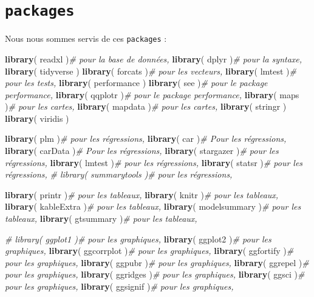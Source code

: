 \documentclass[
  11pt,
  french,
]{article}
\newenvironment{Shaded}{\begin{snugshade}}{\end{snugshade}}
\newcommand{\CommentTok}[1]{\textcolor[rgb]{0.56,0.35,0.01}{\textit{#1}}}
\newcommand{\KeywordTok}[1]{\textcolor[rgb]{0.13,0.29,0.53}{\textbf{#1}}}
\newcommand{\NormalTok}[1]{#1}
\begin{document}
\hypertarget{packages}{%
\section{\texorpdfstring{\texttt{packages}}{packages}}\label{packages}}

Nous nous sommes servis de ces \texttt{packages} :

\begin{Shaded}
\begin{Highlighting}[]
\KeywordTok{library}\NormalTok{( readxl )}\CommentTok{# pour la base de données,}
\KeywordTok{library}\NormalTok{( dplyr )}\CommentTok{# pour la syntaxe,}
\KeywordTok{library}\NormalTok{( tidyverse )}
\KeywordTok{library}\NormalTok{( forcats )}\CommentTok{# pour les vecteurs,}
\KeywordTok{library}\NormalTok{( lmtest )}\CommentTok{# pour les tests,}
\KeywordTok{library}\NormalTok{( performance )}
\KeywordTok{library}\NormalTok{( see )}\CommentTok{# pour le package performance,}
\KeywordTok{library}\NormalTok{( qqplotr )}\CommentTok{# pour le package performance,}
\KeywordTok{library}\NormalTok{( maps )}\CommentTok{# pour les cartes,}
\KeywordTok{library}\NormalTok{( mapdata )}\CommentTok{# pour les cartes,}
\KeywordTok{library}\NormalTok{( stringr )}
\KeywordTok{library}\NormalTok{( viridis )}

\KeywordTok{library}\NormalTok{( plm )}\CommentTok{# pour les régressions,}
\KeywordTok{library}\NormalTok{( car )}\CommentTok{# Pour les régressions,}
\KeywordTok{library}\NormalTok{( carData )}\CommentTok{# Pour les régressions,}
\KeywordTok{library}\NormalTok{( stargazer )}\CommentTok{# pour les régressions,}
\KeywordTok{library}\NormalTok{( lmtest )}\CommentTok{# pour les régressions,}
\KeywordTok{library}\NormalTok{( statsr )}\CommentTok{# pour les régressions,}
\CommentTok{# library( summarytools )# pour les régressions,}

\KeywordTok{library}\NormalTok{( printr )}\CommentTok{# pour les tableaux,}
\KeywordTok{library}\NormalTok{( knitr )}\CommentTok{# pour les tableaux,}
\KeywordTok{library}\NormalTok{( kableExtra )}\CommentTok{# pour les tableaux,}
\KeywordTok{library}\NormalTok{( modelsummary )}\CommentTok{# pour les tableaux,}
\KeywordTok{library}\NormalTok{( gtsummary )}\CommentTok{# pour les tableaux,}

\CommentTok{# library( ggplot1 )# pour les graphiques,}
\KeywordTok{library}\NormalTok{( ggplot2 )}\CommentTok{# pour les graphiques,}
\KeywordTok{library}\NormalTok{( ggcorrplot )}\CommentTok{# pour les graphiques,}
\KeywordTok{library}\NormalTok{( ggfortify )}\CommentTok{# pour les graphiques,}
\KeywordTok{library}\NormalTok{( ggpubr )}\CommentTok{# pour les graphiques,}
\KeywordTok{library}\NormalTok{( ggrepel )}\CommentTok{# pour les graphiques,}
\KeywordTok{library}\NormalTok{( ggridges )}\CommentTok{# pour les graphiques,}
\KeywordTok{library}\NormalTok{( ggsci )}\CommentTok{# pour les graphiques,}
\KeywordTok{library}\NormalTok{( ggsignif )}\CommentTok{# pour les graphiques,}
\end{Highlighting}
\end{Shaded}
\end{document}
